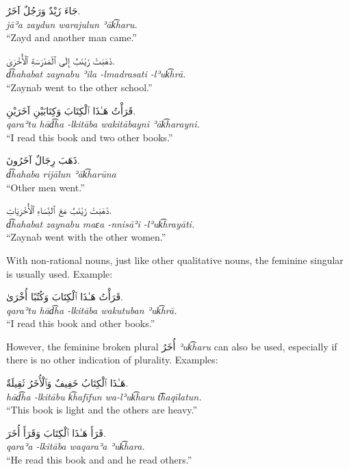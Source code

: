 \documentclass[
  10pt,
]{book}
\begin{document}
\foreignlanguage{arabic}{جَاءَ زَيْدٌ وَرَجُلٌ آخَرُ.}\\
\emph{jāʾa zaydun warajulun ʾāk͡haru.}\\
\enquote{Zayd and another man came.}

\foreignlanguage{arabic}{ذَهَبَتْ زَيْنَبُ إِلَى ٱلْمَدْرَسَةِ ٱلْأُخْرَىٰ.}\\
\emph{d͡hahabat zaynabu ʾila -lmadrasati -lʾuk͡hrā.}\\
\enquote{Zaynab went to the other school.}

\foreignlanguage{arabic}{قَرَأْتُ هَـٰذَا ٱلْکِتَابَ وَکِتَابَيْنِ آخَرَيْنِ.}\\
\emph{qaraʾtu hād͡ha -lkitāba wakitābayni ʾāk͡harayni.}\\
\enquote{I read this book and two other books.}

\foreignlanguage{arabic}{ذَهَبَ رِجَالٌ آخَرُونَ.}\\
\emph{d͡hahaba rijālun ʾāk͡harūna}\\
\enquote{Other men went.}

\foreignlanguage{arabic}{ذَهَبَتْ زَيْنَبُ مَعَ ٱلنِّسَاءِ ٱلْأُخْرَيَاتِ.}\\
\emph{d͡hahabat zaynabu maɛa -nnisāʾi -lʾuk͡hrayāti.}\\
\enquote{Zaynab went with the other women.}

With non-rational nouns, just like other qualitative nouns, the feminine singular is usually used. Example:

\foreignlanguage{arabic}{قَرَأْتُ هَـٰذَا ٱلْکِتَابَ وَکُتُبًا أُخْرَىٰ.}\\
\emph{qaraʾtu hād͡ha -lkitāba wakutuban ʾuk͡hrā.}\\
\enquote{I read this book and other books.}

However, the feminine broken plural \foreignlanguage{arabic}{أُخَرُ} \emph{ʾuk͡haru} can also be used, especially if there is no other indication of plurality. Examples:

\foreignlanguage{arabic}{هَـٰذَا ٱلْکِتَابُ خَفِيفٌ وَٱلْأُخَرُ ثَقِيلَةٌ.}\\
\emph{hād͡ha -lkitābu k͡hafīfun wa-lʾuk͡haru t͡haqīlatun.}\\
\enquote{This book is light and the others are heavy.}

\foreignlanguage{arabic}{قَرَأَ هَـٰذَا ٱلْکِتَابَ وَقَرَأَ أُخَرَ.}\\
\emph{qaraʾa -lkitāba waqaraʾa ʾuk͡hara.}\\
\enquote{He read this book and and he read others.}
\end{document}
